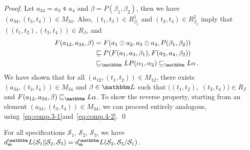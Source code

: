 \documentclass[twocolumn]{svjour3-dummy}
\newcommand*\cS{\mathcal S}
\newcommand*\by{/}
\newcommand*\LL{\mathbbm L}
\begin{document}
\begin{proof}
  Let $a_{ 34}= a_3\obar a_4$ and $\beta= P( \beta_1, \beta_2)$, then we
  have $( a_{ 34},( t_3, t_4))\in M_{ 34}$.  Also, $( t_1, t_3)\in R^1_{
    \beta_1}$ and $( t_2, t_4)\in R^2_{ \beta_2}$ imply that $(( t_1,
  t_2),( t_3, t_4))\in R_\beta$, and
  \begin{align*}
    F( a_{ 12}, a_{ 34}, \beta) &= F( a_1\obar a_2, a_3\obar a_4, P(
    \beta_1, \beta_2)) \\
    &\sqsubseteq P( F( a_1, a_3, \beta_1), F( a_2, a_4,
    \beta_2)) \\
    &\sqsubseteq_\LL P( \alpha_1, \alpha_2)\sqsubseteq_\LL \alpha\,.
  \end{align*}
  We have shown that for all $( a_{ 12},( t_1, t_2))\in M_{ 12}$, there
  exists $( a_{ 34},( t_3, t_4))\in M_{ 34}$ and $\beta\in \LL$ such
  that $(( t_1, t_2),$ $( t_3, t_4))\in R_\beta$ and $F( a_{ 12}, a_{
    34}, \beta)\sqsubseteq_\LL \alpha$.  To show the reverse property,
  starting from an element $( a_{ 34},( t_3, t_4))\in M_{ 34}$, we can
  proceed entirely analogous,
  using~\eqref{eq:comp.3-1}\linebreak[4]and~\eqref{eq:comp.4-2}.  \qed
\end{proof}

\begin{theorem}
  \label{th:quot-q}
  For all specifications $\cS_1$, $\cS_2$, $\cS_3$, we have $\mdl(
  \cS_1\| \cS_2, \cS_3)= \mdl( \cS_2, \cS_3\by \cS_1)$.
\end{theorem}
\end{document}
